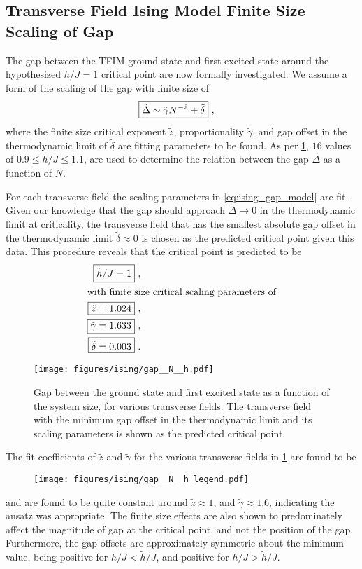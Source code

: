 \documentclass[12pt]{article}{}
\begin{document}
\subsection{Transverse Field Ising Model Finite Size Scaling of Gap}
The gap between the TFIM ground state and first excited state around the hypothesized $\tilde{h}/J = 1$ critical point are now formally investigated. We assume a form of the scaling of the gap with finite size of
\begin{align}
  \Aboxed{\tilde{\Delta} \sim \tilde{\gamma}N^{-\tilde{z}} + \tilde{\delta}}~, \label{eq:ising_gap_model}
\end{align}
where the finite size critical exponent $\tilde{z}$, proportionality $\tilde{\gamma}$, and gap offset in the thermodynamic limit of $\tilde{\delta}$ are fitting parameters to be found. As per \cref{fig:ising_gap_N_h}, $16$ values of $0.9 \leq h/J \leq 1.1$, are used to determine the relation between the gap $\Delta$ as a function of $N$. 

For each transverse field the scaling parameters in \cref{eq:ising_gap_model} are fit. Given our knowledge that the gap should approach $\tilde{\Delta} \to 0$ in the thermodynamic limit at criticality, the transverse field that has the smallest absolute gap offset in the thermodynamic limit $\tilde{\delta} \approx 0$ is chosen as the predicted critical point given this data. This procedure reveals that the critical point is predicted to be
\begin{align}
  \Aboxed{\tilde{h}/J = 1}~, \label{eq:ising_criticalpt} \\
  \intertext{with finite size critical scaling parameters of}
  \Aboxed{\tilde{z} = 1.024}~, \\
  \Aboxed{\tilde{\gamma} = 1.633}~, \\
  \Aboxed{\tilde{\delta} = 0.003}~. 
\end{align}

\begin{figure}[H]
  \centering
  \texttt{[image: figures/ising/gap\_\_N\_\_h.pdf]}
  \caption{Gap between the ground state and first excited state as a function of the system size, for various transverse fields. The transverse field with the minimum gap offset in the thermodynamic limit and its scaling parameters is shown as the predicted critical point.}
  \label{fig:ising_gap_N_h}
\end{figure}
  
The fit coefficients of $\tilde{z}$ and $\tilde{\gamma}$ for the various transverse fields in \cref{fig:ising_gap_N_h} are found to be
\begin{figure}[H]
  \centering
  \texttt{[image: figures/ising/gap\_\_N\_\_h\_legend.pdf]}
  \label{fig:ising_gap_N_h_legend}
\end{figure}
and are found to be quite constant around $\tilde{z} \approx 1$, and $\tilde{\gamma} \approx 1.6$, indicating the ansatz was appropriate. The finite size effects are also shown to predominately affect the magnitude of gap at the critical point, and not the position of the gap. Furthermore, the gap offsets are approximately symmetric about the minimum value, being positive for $h/J< \tilde{h}/J$, and positive for $h/J > \tilde{h}/J$. 
\end{document}

